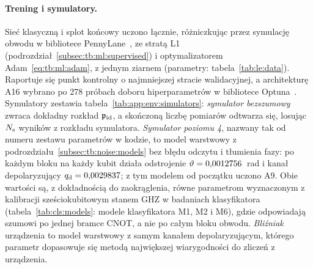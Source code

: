 \paragraph{Trening i symulatory.}\label{par:le:training}\label{par:le:simulators}
Sieć klasyczną i splot końcowy uczono łącznie, różniczkując przez symulację obwodu w bibliotece PennyLane~\cite{bergholm_pennylane_2018}, ze stratą L1 (podrozdział~\ref{subsec:tb:ml:supervised}) i optymalizatorem Adam~\eqref{eq:tb:ml:adam}, z jednym ziarnem (parametry: tabela~\ref{tab:le:data}).
Raportuje się punkt kontrolny o najmniejszej stracie walidacyjnej, a architekturę A16 wybrano po 278 próbach doboru hiperparametrów w bibliotece Optuna~\cite{akiba_optuna_2019}.
Symulatory zestawia tabela~\ref{tab:app:env:simulators}: \emph{symulator bezszumowy} zwraca dokładny rozkład $\mathfrak{p}_{\mathrm{id}}$, a skończoną liczbę pomiarów odtwarza się, losując $N_{\mathrm{s}}$ wyników z rozkładu symulatora.
\emph{Symulator poziomu 4}, nazwany tak od numeru zestawu parametrów w kodzie, to model warstwowy z podrozdziału~\ref{subsec:tb:noise:models} bez błędu odczytu i tłumienia fazy: po każdym bloku na każdy kubit działa odstrojenie $\vartheta=0{,}0012756$~rad i kanał depolaryzujący $q_{\mathrm{d}}=0{,}0029837$; z tym modelem od początku uczono A9.
Obie wartości są, z dokładnością do zaokrąglenia, równe parametrom wyznaczonym z kalibracji sześciokubitowym stanem GHZ w badaniach klasyfikatora (tabela~\ref{tab:cls:models}: modele klasyfikatora M1, M2 i M6), gdzie odpowiadają szumowi po jednej bramce CNOT, a nie po całym bloku obwodu.
\emph{Bliźniak} urządzenia to model warstwowy z samym kanałem depolaryzującym, którego parametr dopasowuje się metodą największej wiarygodności do zliczeń z urządzenia.

